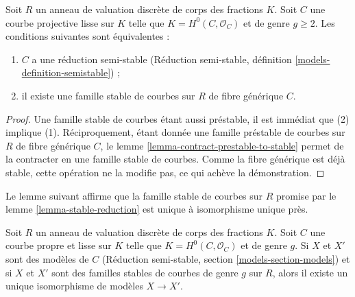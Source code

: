 \begin{lemma}
\label{lemma-stable-reduction}
Soit $R$ un anneau de valuation discrète de corps des fractions $K$.
Soit $C$ une courbe projective lisse sur $K$ telle que
$K = H^0(C, \mathcal{O}_C)$ et de genre $g \geq 2$.
Les conditions suivantes sont équivalentes :
\begin{enumerate}
\item $C$ a une réduction semi-stable
(Réduction semi-stable, définition \ref{models-definition-semistable}) ;
\item il existe une famille stable de courbes sur $R$ de fibre générique $C$.
\end{enumerate}
\end{lemma}

\begin{proof}
Une famille stable de courbes étant aussi préstable, il est immédiat que
(2) implique (1). Réciproquement, étant donnée une famille préstable de courbes sur $R$
de fibre générique $C$, le lemme \ref{lemma-contract-prestable-to-stable}
permet de la contracter en une famille stable de courbes. Comme la fibre générique
est déjà stable, cette opération ne la modifie pas,
ce qui achève la démonstration.
\end{proof}

\noindent
Le lemme suivant affirme que la famille stable de courbes sur $R$
promise par le lemme \ref{lemma-stable-reduction}
est unique à isomorphisme unique près.

\begin{lemma}
\label{lemma-unique-stable-model}
Soit $R$ un anneau de valuation discrète de corps des fractions $K$.
Soit $C$ une courbe propre et lisse sur $K$
telle que $K = H^0(C, \mathcal{O}_C)$ et de genre $g$.
Si $X$ et $X'$ sont des modèles de $C$
(Réduction semi-stable, section \ref{models-section-models})
et si $X$ et $X'$ sont des familles stables de courbes de genre $g$ sur $R$,
alors il existe un unique isomorphisme de modèles $X \to X'$.
\end{lemma}

